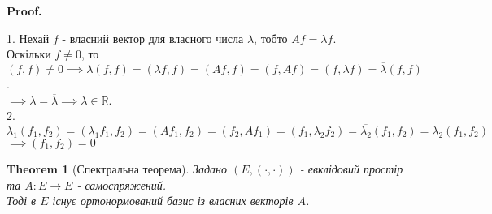 \documentclass[a4paper, 10pt]{article}
\makeatletter
\theoremstyle{theoremdd}
\newtheorem{theorem}{Theorem}[subsection]
\renewenvironment{proof}[1][Proof.\\]{\par
\pushQED{\hfill \qed}%
\normalfont \topsep6\p@\@plus6\p@\relax
\trivlist
\item\relax
{\bfseries
#1\@addpunct{.}}\hspace\labelsep\ignorespaces
}{%
\popQED\endtrivlist\@endpefalse
}
\makeatother
\begin{document}
\begin{proof}
1. Нехай $f$ - власний вектор для власного числа $\lambda$, тобто $Af = \lambda f$.\\
Оскільки $f \neq 0$, то $(f,f) \neq 0 \implies \lambda (f,f) = (\lambda f, f) = (Af,f) = (f,Af) = (f, \lambda f) = \overline{\lambda} (f,f)$.\\
$\implies \lambda = \overline{\lambda} \implies \lambda \in \mathbb{R}$.
\bigskip \\
2. $\lambda_1 (f_1,f_2) = (\lambda_1 f_1, f_2) = (Af_1, f_2) = (f_2, Af_1) = (f_1, \lambda_2 f_2) = \overline{\lambda_2} (f_1,f_2) = \lambda_2 (f_1,f_2)$\\
$\implies (f_1,f_2) = 0$
\end{proof}

\begin{theorem}[Спектральна теорема]
Задано $(E,(\cdot,\cdot))$ - евклідовий простір та $A: E \to E$ - самоспряжений.\\
Тоді в $E$ існує ортонормований базис із власних векторів $A$.
\end{theorem}
\end{document}
